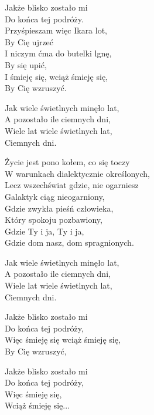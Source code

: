 
\begin{text}
    Jakże blisko zostało mi\\
    Do końca tej podróży.\\
    Przyśpieszam więc Ikara lot,\\
    By Cię ujrzeć\\
    I niczym ćma do butelki lgnę,\\
    By się upić,\\
    I śmieję się, wciąż śmieję się,\\
    By Cię wzruszyć.

    Jak wiele świetlnych minęło lat,\\
    A pozostało ile ciemnych dni,\\
    Wiele lat wiele świetlnych lat,\\
    Ciemnych dni.

    Życie jest pono kołem, co się toczy\\
    W warunkach dialektycznie określonych,\\
    Lecz wszechświat gdzie, nie ogarniesz\\
    Galaktyk ciąg nieogarniony,\\
    Gdzie zwykła pieśń człowieka,\\
    Który spokoju pozbawiony,\\
    Gdzie Ty i ja, Ty i ja,\\
    Gdzie dom nasz, dom spragnionych.

    Jak wiele świetlnych minęło lat,\\
    A pozostało ile ciemnych dni,\\
    Wiele lat wiele świetlnych lat,\\
    Ciemnych dni.

    Jakże blisko zostało mi\\
    Do końca tej podróży,\\
    Więc śmieję się wciąż śmieję się,\\
    By Cię wzruszyć,

    Jakże blisko zostało mi\\
    Do końca tej podróży,\\
    Więc śmieję się,\\
    Wciąż śmieję się...
\end{text}
\begin{chord}

\end{chord}